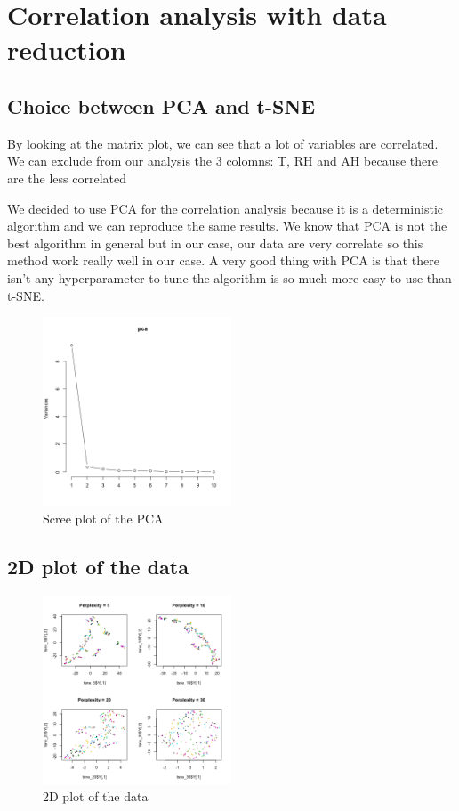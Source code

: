 \section{Correlation analysis with data reduction}

\subsection{Choice between PCA and t-SNE}
By looking at the matrix plot, we can see that a lot of variables are correlated. We can exclude from our analysis the 3 colomns: T, RH and AH because there are the less correlated

We decided to use PCA for the correlation analysis because it is a deterministic algorithm and we can reproduce the same results. 
We know that PCA is not the best algorithm in general but in our case, our data are very correlate so this method work really well in our case. 
A very good thing with PCA is that there isn't any hyperparameter to tune the algorithm is so much more easy to use than t-SNE.

\begin{figure}[h]
\centering
\includegraphics[width=0.5\textwidth]{figs/pca.png}
\caption{Scree plot of the PCA}
\label{fig:scree_plot}
\end{figure}

\subsection{2D plot of the data}


\begin{figure}[H]
\centering
\includegraphics[width=0.5\textwidth]{figs/tsne.png}
\caption{2D plot of the data}
\label{fig:2d_plot}
\end{figure}
